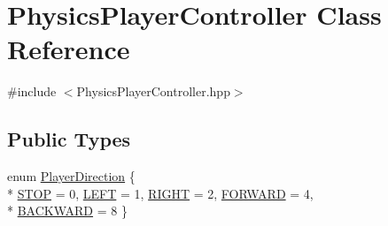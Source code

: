 \hypertarget{classPhysicsPlayerController}{}\section{Physics\+Player\+Controller Class Reference}
\label{classPhysicsPlayerController}


{\ttfamily \#include $<$Physics\+Player\+Controller.\+hpp$>$}

\subsection*{Public Types}
\begin{DoxyCompactItemize}
\item 
enum \hyperlink{classPhysicsPlayerController_a947993cc77a553b6a30c9ea95c81de5e}{Player\+Direction} \{ \\*
\hyperlink{classPhysicsPlayerController_a947993cc77a553b6a30c9ea95c81de5ea9d11193b52d280beca381dc2a4835616}{S\+T\+OP} = 0, 
\hyperlink{classPhysicsPlayerController_a947993cc77a553b6a30c9ea95c81de5eade713714921588c30cd3fffee5cc5c19}{L\+E\+FT} = 1, 
\hyperlink{classPhysicsPlayerController_a947993cc77a553b6a30c9ea95c81de5ea292310309c7421df12e82e529f41ec12}{R\+I\+G\+HT} = 2, 
\hyperlink{classPhysicsPlayerController_a947993cc77a553b6a30c9ea95c81de5eaf14d17d4e0e8cf06489669241e1fd164}{F\+O\+R\+W\+A\+RD} = 4, 
\\*
\hyperlink{classPhysicsPlayerController_a947993cc77a553b6a30c9ea95c81de5ea2cef5a1e4661f46e91fb12727556f62b}{B\+A\+C\+K\+W\+A\+RD} = 8
 \}
\end{DoxyCompactItemize}
